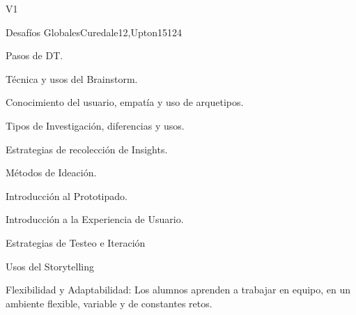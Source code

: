 \begin{syllabus}
\begin{competences}{V1}
    \item {}
\end{competences}

\begin{unit}{Desafíos Globales}{}{Curedale12,Upton15}{12}{4}
   \begin{topics}
      \item Pasos de DT.
      \item Técnica y usos del Brainstorm.
      \item Conocimiento del usuario, empatía y uso de arquetipos.
      \item Tipos de Investigación, diferencias y usos.
      \item Estrategias de recolección de Insights.
      \item Métodos de Ideación.
      \item Introducción al Prototipado.
      \item Introducción a la Experiencia de Usuario.
      \item Estrategias de Testeo e Iteración
      \item Usos del Storytelling
   \end{topics}
   \begin{learningoutcomes}
      \item Flexibilidad y Adaptabilidad: Los alumnos aprenden a trabajar en equipo, en un ambiente flexible, variable y de constantes retos.
   \end{learningoutcomes}
\end{unit}

\begin{coursebibliography}
\end{coursebibliography}

\end{syllabus}
